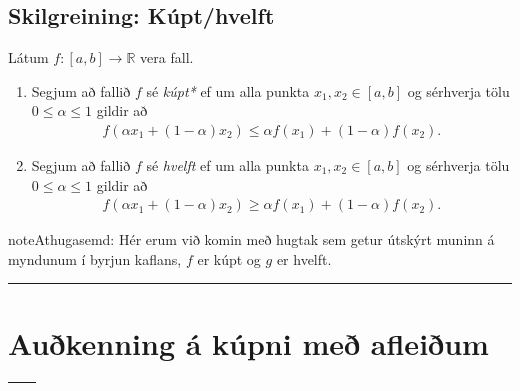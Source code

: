 \documentclass[b5paper,10pt,icelandic]{sphinxmanual}
\begin{document}
\subsection{Skilgreining: Kúpt/hvelft}
\label{\detokenize{kafli05:skilgreining-kupt-hvelft}}\label{\detokenize{kafli05:index-0}}
Látum \(f:[a, b]\rightarrow {\mathbb  R}\) vera fall.
\begin{enumerate}
\item {} 
Segjum að fallið \(f\) sé \textit{kúpt*} ef um
alla punkta \(x_1, x_2\in [a, b]\) og sérhverja tölu
\(0\leq
\alpha\leq 1\) gildir að
\begin{equation*}
\begin{split}f(\alpha x_1+(1-\alpha)x_2)\leq \alpha f(x_1)+(1-\alpha)f(x_2).\end{split}
\end{equation*}
\item {} 
Segjum að fallið \(f\) sé \textit{hvelft}
ef um alla punkta \(x_1, x_2\in [a, b]\) og sérhverja tölu
\(0\leq
\alpha\leq 1\) gildir að
\begin{equation*}
\begin{split}f(\alpha x_1+(1-\alpha)x_2)\geq \alpha f(x_1)+(1-\alpha)f(x_2).\end{split}
\end{equation*}
\end{enumerate}

\begin{sphinxadmonition}{note}{Athugasemd:}
Hér erum við komin með hugtak sem getur útskýrt muninn á myndunum í byrjun
kaflans, \(f\) er kúpt og \(g\) er hvelft.
\end{sphinxadmonition}


\bigskip\hrule\bigskip



\section{Auðkenning á kúpni með afleiðum}
\label{\detokenize{kafli05:aukenning-a-kupni-me-afleium}}

\begin{savenotes}\sphinxattablestart
\centering
\begin{tabulary}{\linewidth}[t]{|T|T|}
\hline
{}\label{\detokenize{kafli05:id1}}
&\label{\detokenize{kafli05:id2}}
\\
\hline
\end{tabulary}
\par
\sphinxattableend\end{savenotes}
\end{document}
